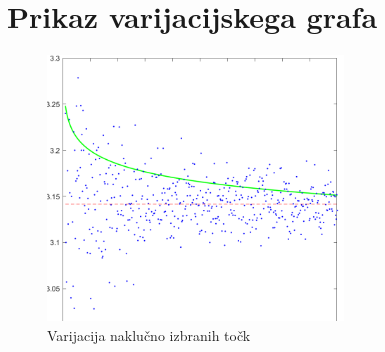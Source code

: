 \documentclass{beamer}
\begin{document}
\section{Prikaz varijacijskega grafa}
\begin{frame}
\tableofcontents[currentsection] %
\end{frame}
\begin{frame}
\begin{figure}
\includegraphics[width=0.7\textwidth]{slika22.png}
\caption{Varijacija naklučno izbranih točk}
\end{figure}
\end{frame}
\end{document}
